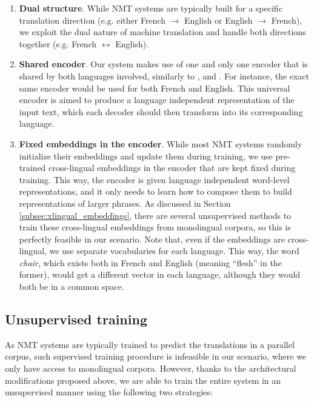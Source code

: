 \documentclass{article} \usepackage{iclr2018_conference,times}
\begin{document}
\begin{enumerate}
\item \textbf{Dual structure}. While NMT systems are typically built for a specific translation direction (e.g. either French $\rightarrow$ English or English $\rightarrow$ French), we exploit the dual nature of machine translation \citep{he2016dual,firat2016multi} and handle both directions together (e.g. French $\leftrightarrow$ English).

\item \textbf{Shared encoder}. Our system makes use of one and only one encoder that is shared by both languages involved, similarly to \citet{ha2016toward}, \citet{lee2017fully} and \citet{johnson2017google}. For instance, the exact same encoder would be used for both French and English. This universal encoder is aimed to produce a language independent representation of the input text, which each decoder should then transform into its corresponding language.

\item \textbf{Fixed embeddings in the encoder}. While most NMT systems randomly initialize their embeddings and update them during training, we use pre-trained cross-lingual embeddings in the encoder that are kept fixed during training. This way, the encoder is given language independent word-level representations, and it only needs to learn how to compose them to build representations of larger phrases. As discussed in Section \ref{subsec:xlingual_embeddings}, there are several unsupervised methods to train these cross-lingual embeddings from monolingual corpora, so this is perfectly feasible in our scenario. Note that, even if the embeddings are cross-lingual, we use separate vocabularies for each language. This way, the word \textit{chair}, which exists both in French and English (meaning ``flesh'' in the former), would get a different vector in each language, although they would both be in a common space.
\end{enumerate}


\subsection{Unsupervised training} 
\label{subsec:training}

As NMT systems are typically trained to predict the translations in a parallel corpus, such supervised training procedure is infeasible in our scenario, where we only have access to monolingual corpora. However, thanks to the architectural modifications proposed above, we are able to train the entire system in an unsupervised manner using the following two strategies:
\end{document}
